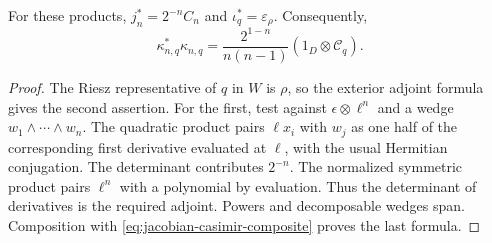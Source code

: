 \begin{lemma}
\label{lem:jacobian-adjoint}
For these products, \(j_n^*=2^{-n}C_n\) and
\(\iota_q^*=\varepsilon_{\rho}\). Consequently,
\begin{equation}\label{eq:contraction-gram-casimir}
 \kappa_{n,q}^*\kappa_{n,q}
 =\frac{2^{1-n}}{n(n-1)}(1_D\otimes\mathscr C_q).
\end{equation}
\end{lemma}
\begin{proof}
The Riesz representative of \(q\) in \(W\) is \(\rho\),
so the exterior adjoint formula gives the second assertion. For the
first, test against \(\epsilon\otimes\ell^n\) and a wedge
\(w_1\wedge\cdots\wedge w_n\). The quadratic product pairs
\(\ell x_i\) with \(w_j\) as one half of the corresponding
first derivative evaluated at \(\ell\), with the usual Hermitian
conjugation. The determinant contributes \(2^{-n}\).
The normalized symmetric product pairs \(\ell^n\) with a
polynomial by evaluation. Thus the determinant of derivatives is the
required adjoint. Powers and decomposable wedges span. Composition
with \eqref{eq:jacobian-casimir-composite} proves the last formula.
\end{proof}

